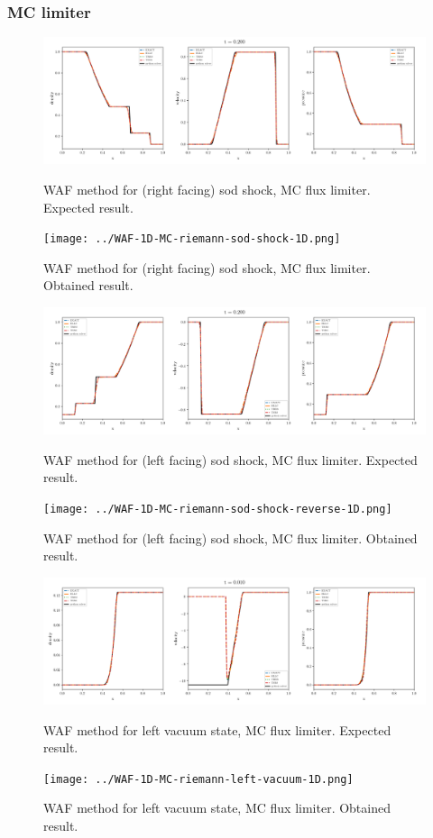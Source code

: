\clearpage
\subsubsection{MC limiter}

    \begin{figure}[htbp]
        \centering
        \includegraphics[width=.9\textwidth]{./figures/WAF-1D-MC-riemann-sod-shock-1D.png}%
        \caption{WAF method for (right facing) sod shock, MC flux limiter. Expected result.}
        \texttt{[image: ../WAF-1D-MC-riemann-sod-shock-1D.png]}%
        \caption{WAF method for (right facing) sod shock, MC flux limiter. Obtained result.}
    \end{figure}


    \begin{figure}[htbp]
        \centering
        \includegraphics[width=.9\textwidth]{./figures/WAF-1D-MC-riemann-sod-shock-reverse-1D.png}%
        \caption{WAF method for (left facing) sod shock, MC flux limiter. Expected result.}
        \texttt{[image: ../WAF-1D-MC-riemann-sod-shock-reverse-1D.png]}%
        \caption{WAF method for (left facing) sod shock, MC flux limiter. Obtained result.}
    \end{figure}



    \begin{figure}[htbp]
        \centering
        \includegraphics[width=.9\textwidth]{./figures/WAF-1D-MC-riemann-left-vacuum-1D.png}%
        \caption{WAF method for left vacuum state, MC flux limiter. Expected result.}
        \texttt{[image: ../WAF-1D-MC-riemann-left-vacuum-1D.png]}
        \caption{WAF method for left vacuum state, MC flux limiter. Obtained result.}
    \end{figure}



